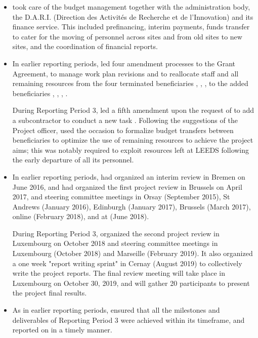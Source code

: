 \begin{itemize}
\item {} took care of the budget management together with the
  administration body, the D.A.R.I. (Direction des Activités de
  Recherche et de l'Innovation) and its finance service. This included
  prefinancing, interim payments, funds transfer to cater for the moving of personnel
  across sites and from old sites to new sites, and the coordination
  of financial reports.
\item In earlier reporting periods,  led four amendment
  processes to the Grant Agreement, to manage work plan revisions and
  to reallocate staff and all remaining resources from the four
  terminated beneficiaries , , ,
   to the added beneficiaries , ,
  , .

  \noindent
  During Reporting Period 3,  led a fifth amendment upon
  the request of  to add a subcontractor to conduct a new
  task . Following the suggestions of
  the Project officer,  used the occasion to formalize budget
  transfers between beneficiaries to optimize the use of remaining
  resources to achieve the project aims; this was notably required to
  exploit resources left at LEEDS following the early departure of all
  its personnel.

\item In earlier reporting periods,
   had organized an interim review in Bremen on
  June 2016, and  had organized the first
  project review in Brussels on April 2017, and steering committee
  meetings in Orsay (September 2015), St Andrews (January 2016),
  Edinburgh (January 2017), Brussels (March 2017), online (February
  2018), and at  (June 2018).

  \noindent
  During Reporting Period 3,  organized the second project
  review in Luxembourg on October 2018 and steering committee meetings
  in Luxembourg (October 2018) and Marseille (February 2019). It also
  organized a one week "report writing sprint" in Cernay (August 2019)
  to collectively write the project reports. The final review meeting
  will take place in Luxembourg on October 30, 2019, and will gather
  20 \ODK participants to present the project final results.

\item As in earlier reporting periods,  ensured that all the
  milestones and deliverables of Reporting Period 3 were achieved
  within its timeframe, and reported on in a timely manner.


\end{itemize}
